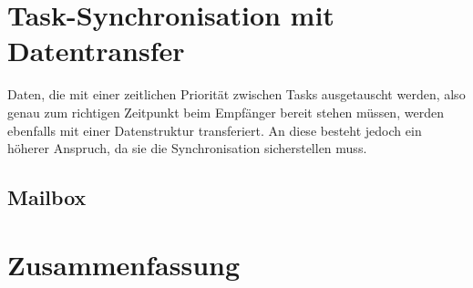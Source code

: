 \documentclass{llncs}
\begin{document}
\section{Task-Synchronisation mit Datentransfer}
Daten, die mit einer zeitlichen Priorität zwischen Tasks ausgetauscht werden, also genau zum richtigen Zeitpunkt beim Empfänger bereit stehen müssen, werden ebenfalls mit einer Datenstruktur transferiert. An diese besteht jedoch ein höherer Anspruch, da sie die Synchronisation sicherstellen muss.
\subsection{Mailbox}
\section{Zusammenfassung}

\printbibliography
\end{document}
